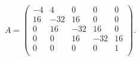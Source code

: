 \begin{solution}
    \begingroup
    \renewcommand*{\arraystretch}{1.5}
    $$
        A =
        \begin{pmatrix}
            -4 &   4 &   0  &   0 &  0 \\
            16 & -32 &  16  &   0 &  0 \\
             0 &  16 & -32  &  16 &  0 \\
             0 &   0 &  16  & -32 & 16 \\
             0 &   0 &   0  &   0 &  1 \\
        \end{pmatrix}.
    $$
    \endgroup
\end{solution}